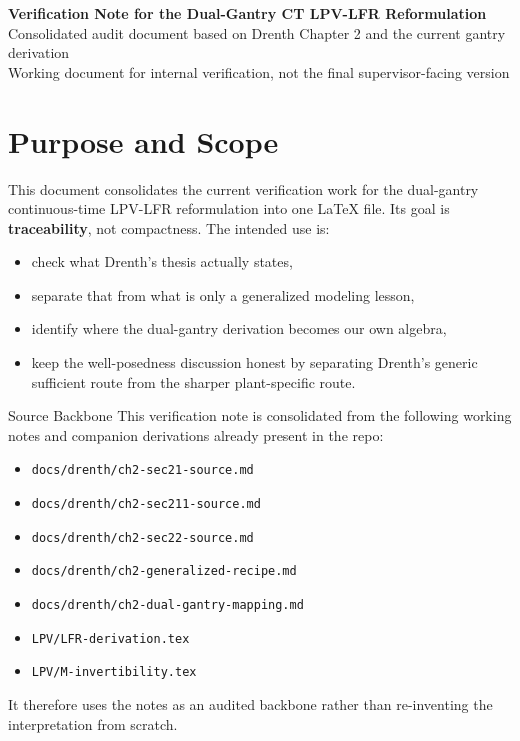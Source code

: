﻿\documentclass[11pt]{article}
\begin{document}
\begin{center}
    {\LARGE\bfseries Verification Note for the Dual-Gantry CT LPV-LFR Reformulation}\\[0.5em]
    {\large Consolidated audit document based on Drenth Chapter 2 and the current gantry derivation}\\[0.3em]
    {\normalsize Working document for internal verification, not the final supervisor-facing version}
\end{center}

\vspace{0.7em}

\section{Purpose and Scope}

This document consolidates the current verification work for the dual-gantry
continuous-time LPV-LFR reformulation into one \LaTeX{} file. Its goal is
\textbf{traceability}, not compactness. The intended use is:

\begin{itemize}[leftmargin=1.2em]
    \item check what Drenth's thesis actually states,
    \item separate that from what is only a generalized modeling lesson,
    \item identify where the dual-gantry derivation becomes our own algebra,
    \item keep the well-posedness discussion honest by separating Drenth's
    generic sufficient route from the sharper plant-specific route.
\end{itemize}

\begin{notebox}{Source Backbone}
This verification note is consolidated from the following working notes and
companion derivations already present in the repo:
\begin{itemize}[leftmargin=1.2em]
    \item \texttt{docs/drenth/ch2-sec21-source.md}
    \item \texttt{docs/drenth/ch2-sec211-source.md}
    \item \texttt{docs/drenth/ch2-sec22-source.md}
    \item \texttt{docs/drenth/ch2-generalized-recipe.md}
    \item \texttt{docs/drenth/ch2-dual-gantry-mapping.md}
    \item \texttt{LPV/LFR-derivation.tex}
    \item \texttt{LPV/M-invertibility.tex}
\end{itemize}
It therefore uses the notes as an audited backbone rather than re-inventing the
interpretation from scratch.
\end{notebox}
\end{document}
